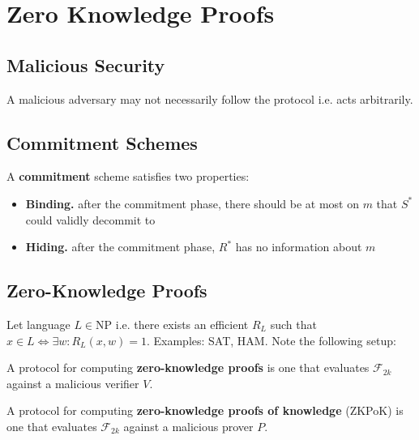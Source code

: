 \section{Zero Knowledge Proofs}

\subsection{Malicious Security}

A malicious adversary may not necessarily follow the protocol i.e. acts arbitrarily.


\subsection{Commitment Schemes}

\begin{defn}
A \textbf{commitment} scheme satisfies two properties:
\begin{itemize}
    \item \textbf{Binding.} after the commitment phase, there should be at most on $m$ that $S^*$ could validly decommit to
    \item \textbf{Hiding.} after the commitment phase, $R^*$ has no information about $m$
\end{itemize}
\end{defn}

\subsection{Zero-Knowledge Proofs}

Let language $L \in \text{NP}$ i.e. there exists an efficient $R_L$ such that $x \in L \iff \exists w : R_L(x,w) = 1$.
Examples: SAT, HAM.
Note the following setup:


\begin{defn}
A protocol for computing \textbf{zero-knowledge proofs} is one that evaluates $\mathcal{F}_{2k}$ against a malicious verifier $V$.
\end{defn}

\begin{defn}
A protocol for computing \textbf{zero-knowledge proofs of knowledge} (ZKPoK) is one that evaluates $\mathcal{F}_{2k}$ against a malicious prover $P$.
\end{defn}

